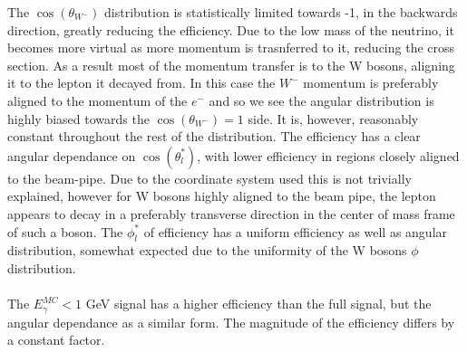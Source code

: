 The $\cos{({\theta}_{{W}^{-}})}$ distribution is statistically limited towards -1, in the backwards direction, greatly reducing the efficiency. Due to the low mass of the neutrino, it becomes more virtual as more momentum is trasnferred to it, reducing the cross section. As a result most of the momentum transfer is to the W bosons, aligning it to the lepton it decayed from. In this case the ${W}^{-}$ momentum is preferably aligned to the momentum of the ${e}^{-}$ and so we see the angular distribution is highly biased towards the $\cos{({\theta}_{{W}^{-}})} = 1$ side. It is, however, reasonably constant throughout the rest of the distribution. The efficiency has a clear angular dependance on $\cos{({\theta}_{l}^{*})}$, with lower efficiency in regions closely aligned to the beam-pipe. Due to the coordinate system used this is not trivially explained, however for W bosons highly aligned to the beam pipe, the lepton appears to decay in a preferably transverse direction in the center of mass frame of such a boson. The ${\phi}_{l}^{*}$ of efficiency has a uniform efficiency as well as angular distribution, somewhat expected due to the uniformity of the W bosons ${\phi}$ distribution.
\\\\
The ${E}_{\gamma}^{MC} < 1$ GeV signal has a higher efficiency than the full signal, but the angular dependance as a similar form. The magnitude of the efficiency differs by a constant factor.
